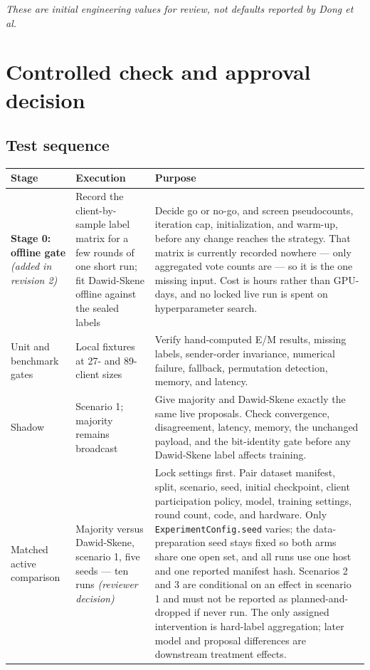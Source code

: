 \documentclass[10pt,a4paper]{article}
\newcommand{\code}[1]{\texttt{#1}}
\begin{document}
\textit{These are initial engineering values for review, not defaults reported by Dong et al.}

\endgroup

\clearpage

\section{Controlled check and approval decision}\label{sec:test}

\subsection{Test sequence}

\begin{table}[H]
\centering
\begin{tabularx}{\textwidth}{L{0.18\textwidth}L{0.22\textwidth}Y}
\toprule
\textbf{Stage} & \textbf{Execution} & \textbf{Purpose} \\
\midrule
\textbf{Stage 0: offline gate} \textit{(added in revision 2)} & Record the client-by-sample label
matrix for a few rounds of one short run; fit Dawid-Skene offline against the sealed labels & Decide
go or no-go, and screen pseudocounts, iteration cap, initialization, and warm-up, before any change
reaches the strategy. That matrix is currently recorded nowhere --- only aggregated vote counts are
--- so it is the one missing input. Cost is hours rather than GPU-days, and no locked live run is
spent on hyperparameter search. \\
Unit and benchmark gates & Local fixtures at 27- and 89-client sizes & Verify hand-computed E/M
results, missing labels, sender-order invariance, numerical failure, fallback, permutation detection,
memory, and latency. \\
Shadow & Scenario 1; majority remains broadcast & Give majority and Dawid-Skene exactly the same live
proposals. Check convergence, disagreement, latency, memory, the unchanged payload, and the
bit-identity gate before any Dawid-Skene label affects training. \\
Matched active comparison & Majority versus Dawid-Skene, scenario 1, five seeds --- ten runs
\textit{(reviewer decision)} & Lock settings first. Pair dataset manifest, split, scenario, seed,
initial checkpoint, client participation policy, model, training settings, round count, code, and
hardware. Only \code{ExperimentConfig.seed} varies; the data-preparation seed stays fixed so both arms
share one open set, and all runs use one host and one reported manifest hash. Scenarios 2 and 3 are
conditional on an effect in scenario 1 and must not be reported as planned-and-dropped if never run.
The only assigned intervention is hard-label aggregation; later model and proposal differences are
downstream treatment effects. \\
\bottomrule
\end{tabularx}
\end{table}
\end{document}
